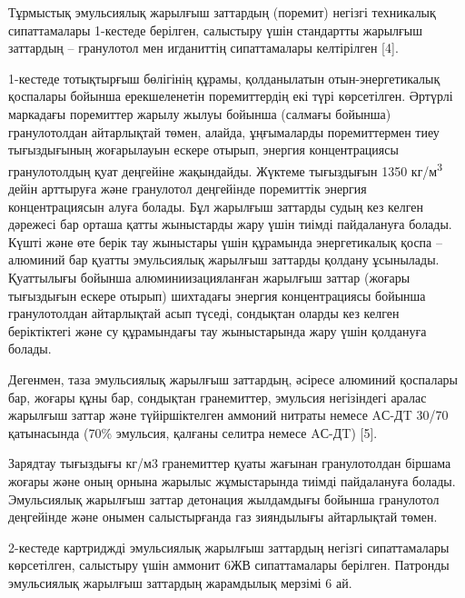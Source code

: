\begin{multicols}{2}
Тұрмыстық эмульсиялық жарылғыш заттардың (поремит) негізгі техникалық
сипаттамалары 1-кестеде берілген, салыстыру үшін стандартты жарылғыш
заттардың -- гранулотол мен игданиттің сипаттамалары келтірілген
{[}4{]}.

1-кестеде тотықтырғыш бөлігінің құрамы, қолданылатын отын-энергетикалық
қоспалары бойынша ерекшеленетін поремиттердің екі түрі көрсетілген.
Әртүрлі маркадағы поремиттер жарылу жылуы бойынша (салмағы бойынша)
гранулотолдан айтарлықтай төмен, алайда, ұңғымаларды поремиттермен тиеу
тығыздығының жоғарылауын ескере отырып, энергия концентрациясы
гранулотолдың қуат деңгейіне жақындайды. Жүктеме тығыздығын 1350
кг/м\textsuperscript{3} дейін арттыруға және гранулотол деңгейінде
поремиттік энергия концентрациясын алуға болады. Бұл жарылғыш заттарды
судың кез келген дәрежесі бар орташа қатты жыныстарды жару үшін тиімді
пайдалануға болады. Күшті және өте берік тау жыныстары үшін құрамында
энергетикалық қоспа -- алюминий бар қуатты эмульсиялық жарылғыш заттарды
қолдану ұсынылады. Қуаттылығы бойынша алюминиизацияланған жарылғыш
заттар (жоғары тығыздығын ескере отырып) шихтадағы энергия
концентрациясы бойынша гранулотолдан айтарлықтай асып түседі, сондықтан
оларды кез келген беріктіктегі және су құрамындағы тау жыныстарында жару
үшін қолдануға болады.

Дегенмен, таза эмульсиялық жарылғыш заттардың, әсіресе алюминий
қоспалары бар, жоғары құны бар, сондықтан гранемиттер, эмульсия
негізіндегі аралас жарылғыш заттар және түйіршіктелген аммоний нитраты
немесе AС-ДT 30/70 қатынасында (70\% эмульсия, қалғаны селитра немесе
AС-ДT) {[}5{]}.

Зарядтау тығыздығы кг/м3 гранемиттер қуаты жағынан гранулотолдан біршама
жоғары және оның орнына жарылыс жұмыстарында тиімді пайдалануға болады.
Эмульсиялық жарылғыш заттар детонация жылдамдығы бойынша гранулотол
деңгейінде және онымен салыстырғанда газ зияндылығы айтарлықтай төмен.

2-кестеде картриджді эмульсиялық жарылғыш заттардың негізгі
сипаттамалары көрсетілген, салыстыру үшін аммонит 6ЖВ сипаттамалары
берілген. Патронды эмульсиялық жарылғыш заттардың жарамдылық мерзімі 6
ай.
\end{multicols}

